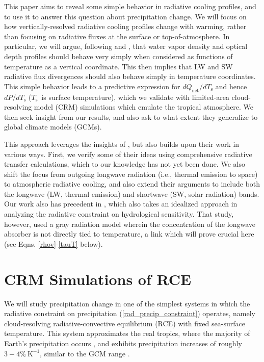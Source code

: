\documentclass[9pt,twocolumn,twoside,lineno]{pnas-new}
\newcommand{\eqnref}[1]{(\ref{#1})}
\newcommand{\Qnet}{\ensuremath{Q_\mathrm{net}}}
\newcommand{\Kinverse}{\ensuremath{\mathrm{K^{-1}}}}
\newcommand{\Ts}{\ensuremath{T_\mathrm{s}}}
\begin{document}
This paper aims to reveal some simple behavior in radiative cooling profiles, and to use it to  answer this question about precipitation change. We will  focus on how vertically-resolved radiative cooling profiles change with warming, rather than focusing on radiative fluxes at the surface or top-of-atmosphere. In particular, we will argue, following \cite{simpson1928} and \cite{ingram2010}, that water vapor density and optical depth profiles should behave very simply when considered as functions of temperature as a vertical coordinate. This then implies  that LW and SW radiative flux divergences should also behave simply in temperature coordinates. This simple behavior leads to a predictive expression for $d\Qnet/d\Ts$ and hence $dP/d\Ts$ (\Ts\ is surface temperature), which we validate with limited-area cloud-resolving model (CRM) simulations which emulate  the tropical atmosphere. We then seek insight from our results, and also ask to what extent they generalize to global climate models (GCMs). 


This approach leverages the insights of \cite{simpson1928, ingram2010}, but also builds upon their work in various ways. First, we verify some of their ideas using comprehensive radiative transfer calculations, which to our knowledge has not yet been done. We also shift the focus from outgoing longwave radiation (i.e., thermal emission to space) to atmospheric radiative cooling, and also extend their  arguments to include both the longwave (LW, thermal emission) and shortwave (SW, solar radiation) bands. Our work also has precedent in \cite{takahashi2009}, which also takes an idealized approach in analyzing the radiative constraint on hydrological sensitivity. That study, however,  used a gray radiation model wherein the concentration of the longwave absorber is not directly tied to temperature, a  link which will prove crucial here (see Eqns. \ref{rhov}-\ref{tauT} below).

\section{CRM Simulations of RCE}
We will study precipitation change in one of the simplest systems in which the radiative constraint on precipitation \eqnref{rad_precip_constraint} operates, namely cloud-resolving radiative-convective equilibrium (RCE) with fixed sea-surface temperature. This system approximates the real tropics, where the majority of Earth's precipitation occurs \cite{simpson1988}, and exhibits precipitation increases of roughly $3 -4\%\ \Kinverse$, similar to the GCM range \cite{romps2011, muller2011b}.  
\end{document}
